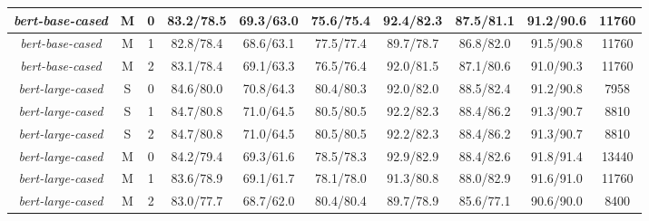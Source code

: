 \begin{table*}
{\begin{tabular}{|c|c|c||c|c|c|c|c|c||c|}
\textit{bert-base-cased} & M & 0 & 83.2/78.5 & 69.3/63.0 & 75.6/75.4 & 92.4/82.3 & 87.5/81.1 & 91.2/90.6 & 11760 \\ \hline
\textit{bert-base-cased} & M & 1 & 82.8/78.4 & 68.6/63.1 & 77.5/77.4 & 89.7/78.7 & 86.8/82.0 & 91.5/90.8 & 11760 \\ \hline
\textit{bert-base-cased} & M & 2 & 83.1/78.4 & 69.1/63.3 & 76.5/76.4 & 92.0/81.5 & 87.1/80.6 & 91.0/90.3 & 11760 \\ \hline
\textit{bert-large-cased} & S & 0 & 84.6/80.0 & 70.8/64.3 & 80.4/80.3 & 92.0/82.0 & 88.5/82.4 & 91.2/90.8 & 7958 \\ \hline
\textit{bert-large-cased} & S & 1 & 84.7/80.8 & 71.0/64.5 & 80.5/80.5 & 92.2/82.3 & 88.4/86.2 & 91.3/90.7 & 8810 \\ \hline
\textit{bert-large-cased} & S & 2 & 84.7/80.8 & 71.0/64.5 & 80.5/80.5 & 92.2/82.3 & 88.4/86.2 & 91.3/90.7 & 8810 \\ \hline
\textit{bert-large-cased} & M & 0 & 84.2/79.4 & 69.3/61.6 & 78.5/78.3 & 92.9/82.9 & 88.4/82.6 & 91.8/91.4 & 13440 \\ \hline
\textit{bert-large-cased} & M & 1 & 83.6/78.9 & 69.1/61.7 & 78.1/78.0 & 91.3/80.8 & 88.0/82.9 & 91.6/91.0 & 11760 \\ \hline
\textit{bert-large-cased} & M & 2 & 83.0/77.7 & 68.7/62.0 & 80.4/80.4 & 89.7/78.9 & 85.6/77.1 & 90.6/90.0 & 8400 \\ \hline
\end{tabular}}
\end{table*}


